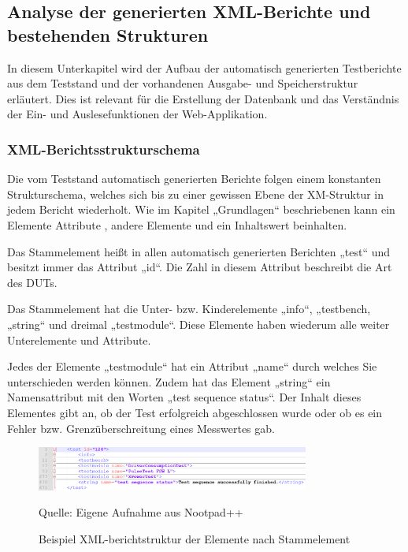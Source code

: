 \subsection{Analyse der generierten XML-Berichte und bestehenden Strukturen}
\label{subsec:analyse-der-generierten-xml-berichte-und-bestehenden-strukturen}

In diesem Unterkapitel wird der Aufbau der automatisch generierten Testberichte aus dem Teststand und der vorhandenen Ausgabe- und Speicherstruktur erläutert. Dies ist relevant für die Erstellung der Datenbank und das Verständnis der Ein- und Auslesefunktionen der Web-Applikation.


\subsubsection{XML-Berichtsstrukturschema}

Die vom Teststand automatisch generierten Berichte folgen einem konstanten Strukturschema, welches sich bis zu einer gewissen Ebene der XM-Struktur in jedem Bericht wiederholt. Wie im Kapitel „Grundlagen“ beschriebenen kann ein Elemente Attribute , andere Elemente und ein Inhaltswert beinhalten.

Das Stammelement heißt in allen automatisch generierten Berichten „test“ und besitzt immer das Attribut „id“. Die Zahl in diesem Attribut beschreibt die Art des \ac{DUTs}.

Das Stammelement hat die Unter- bzw. Kinderelemente „info“, „testbench, „string“ und dreimal „testmodule“. Diese Elemente haben wiederum alle weiter Unterelemente und Attribute.

Jedes der Elemente „testmodule“ hat ein Attribut „name“ durch welches Sie unterschieden werden können. Zudem hat das Element „string“ ein Namensattribut mit den Worten „test sequence status“. Der Inhalt dieses Elementes gibt an, ob der Test erfolgreich abgeschlossen wurde oder ob es ein Fehler bzw. Grenzüberschreitung eines Messwertes gab.

\begin{figure}[h]
    \centering
    \includegraphics[width=0.8\textwidth]{Grafiken/Obere_XML-Berichtstruktur(1).png}
    \caption{Beispiel XML-berichtstruktur der Elemente nach Stammelement}
    \label{fig:3. Beispiel XML-berichtstruktur Elemente nach Stammelement}
    {Quelle: Eigene Aufnahme aus Nootpad++}
\end{figure}